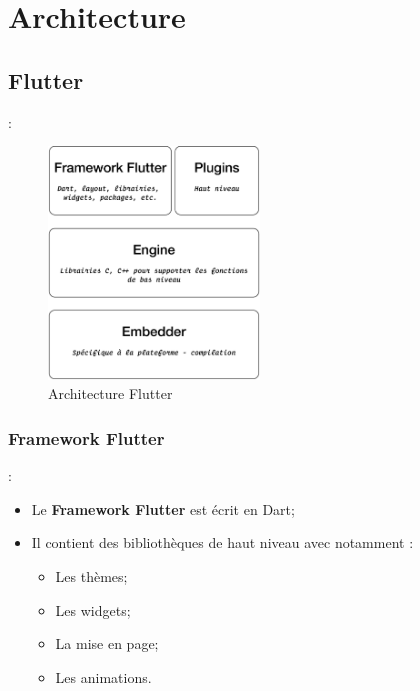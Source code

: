 \documentclass[10pt]{beamer}
\begin{document}
\section{Architecture}

\subsection{Flutter}
\begin{frame}[fragile,t]{\secname : \subsecname}
    \begin{figure}[H]
        \begin{center}
            \includegraphics[width=0.5\textwidth]{../assets/img/architecture-flutter.eps}
            \caption*{Architecture Flutter \cite{raywenderlich2020flutter}}
            \label{Fig:architecture-flutter}
        \end{center}
    \end{figure}
\end{frame}

\subsubsection{Framework Flutter}
\begin{frame}[fragile,t]{\secname : \subsecname}
    \begin{itemize}
        \item Le \textbf{Framework Flutter} est écrit en Dart;
        \item Il contient des bibliothèques de haut niveau avec notamment :
              \begin{itemize}
                  \item Les thèmes;
                  \item Les widgets;
                  \item La mise en page;
                  \item Les animations.
              \end{itemize}
    \end{itemize}
\end{frame}
\end{document}
